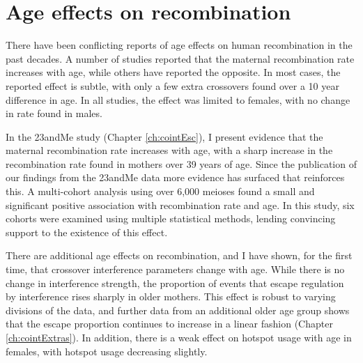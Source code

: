 \section{Age effects on recombination}


There have been conflicting reports of age effects on human recombination in the past decades.
A number of studies reported that the maternal recombination rate increases with age\cite{Kong2004,Coop2008}, while others have reported the opposite\cite{Hussin2011,Bleazard2013}.
In most cases, the reported effect is subtle, with only a few extra crossovers found over a 10 year difference in age.
In all studies, the effect was limited to females, with no change in rate found in males.

In the 23andMe study (Chapter \ref{ch:cointEsc}), I present evidence that the maternal recombination rate increases with age, with a sharp increase in the recombination rate found in mothers over 39 years of age.
Since the publication of our findings from the 23andMe data more evidence has surfaced that reinforces this.
A multi-cohort analysis using over 6,000 meioses found a small and significant positive association with recombination rate and age\cite{Martin2015}.
In this study, six cohorts were examined using multiple statistical methods, lending convincing support to the existence of this effect.

There are additional age effects on recombination, and 
I have shown, for the first time, that crossover interference parameters change with age.
While there is no change in interference strength, the proportion of events that escape regulation by interference rises sharply in older mothers.
This effect is robust to varying divisions of the data, and further data from an additional older age group shows that the escape proportion continues to increase in a linear fashion (Chapter \ref{ch:cointExtras}).
In addition, there is a weak effect on hotspot usage with age in females, with hotspot usage decreasing slightly.


